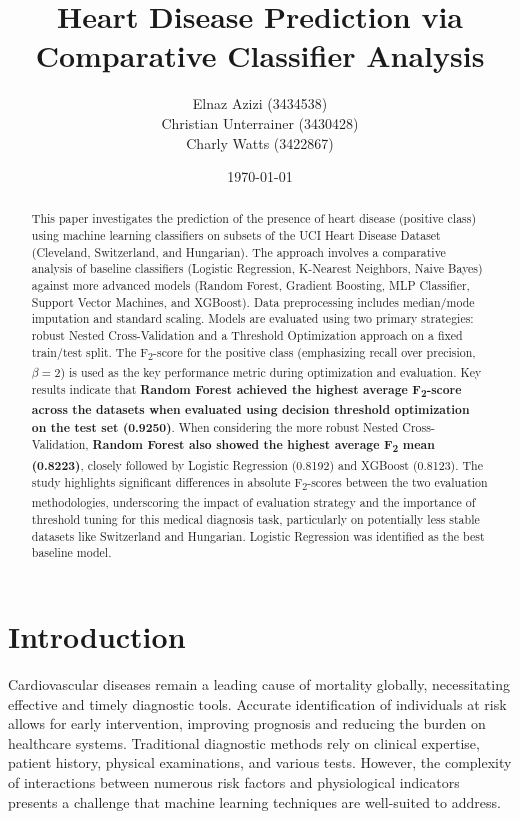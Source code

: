 \documentclass{article}
\title{Heart Disease Prediction via Comparative Classifier Analysis}
\author{
    Elnaz Azizi (3434538) \\ %
    Christian Unterrainer (3430428)\\ %
    Charly Watts (3422867)
}
\date{\today}
\begin{document}
\maketitle

\begin{abstract}
This paper investigates the prediction of the presence of heart disease (positive class) using machine learning classifiers on subsets of the UCI Heart Disease Dataset (Cleveland, Switzerland, and Hungarian). The approach involves a comparative analysis of baseline classifiers (Logistic Regression, K-Nearest Neighbors, Naive Bayes) against more advanced models (Random Forest, Gradient Boosting, MLP Classifier, Support Vector Machines, and XGBoost). Data preprocessing includes median/mode imputation and standard scaling. Models are evaluated using two primary strategies: robust Nested Cross-Validation and a Threshold Optimization approach on a fixed train/test split. The F\textsubscript{2}-score for the positive class (emphasizing recall over precision, $\beta=2$) is used as the key performance metric during optimization and evaluation. Key results indicate that \textbf{Random Forest achieved the highest average F\textsubscript{2}-score across the datasets when evaluated using decision threshold optimization on the test set (0.9250)}. When considering the more robust Nested Cross-Validation, \textbf{Random Forest also showed the highest average F\textsubscript{2} mean (0.8223)}, closely followed by Logistic Regression (0.8192) and XGBoost (0.8123). The study highlights significant differences in absolute F\textsubscript{2}-scores between the two evaluation methodologies, underscoring the impact of evaluation strategy and the importance of threshold tuning for this medical diagnosis task, particularly on potentially less stable datasets like Switzerland and Hungarian. Logistic Regression was identified as the best baseline model.
\end{abstract}

\section{Introduction}
\label{sec:introduction}

Cardiovascular diseases remain a leading cause of mortality globally, necessitating effective and timely diagnostic tools. Accurate identification of individuals at risk allows for early intervention, improving prognosis and reducing the burden on healthcare systems. Traditional diagnostic methods rely on clinical expertise, patient history, physical examinations, and various tests. However, the complexity of interactions between numerous risk factors and physiological indicators presents a challenge that machine learning techniques are well-suited to address.
\end{document}
